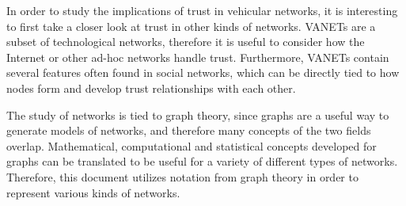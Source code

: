 In order to study the implications of trust in vehicular networks, it is interesting to first take a closer look at trust in other kinds of networks.
VANETs are a subset of technological networks, therefore it is useful to consider how the Internet or other ad-hoc networks handle trust.
Furthermore, VANETs contain several features often found in social networks, which can be directly tied to how nodes form and develop trust relationships with each other.


%

The study of networks is tied to graph theory, since graphs are a useful way to generate models of networks, and therefore many concepts of the two fields overlap.
Mathematical, computational and statistical concepts developed for graphs can be translated to be useful for a variety of different types of networks.
Therefore, this document utilizes notation from graph theory in order to represent various kinds of networks.

